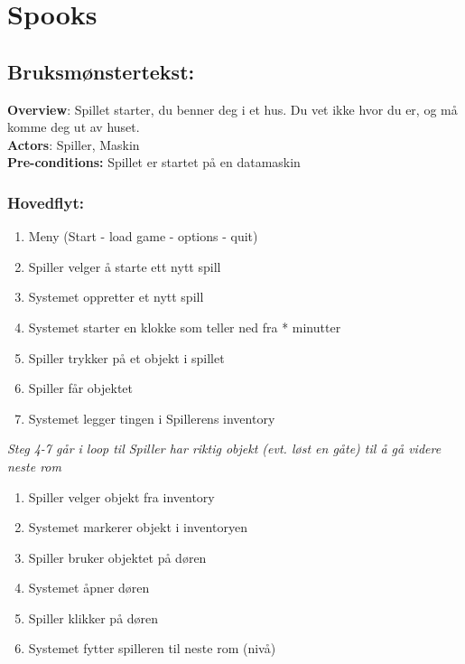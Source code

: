 \documentclass[12pt]{report}
\begin{document}
\section*{Spooks}

\subsection*{Bruksm{\o}nstertekst:}

\textbf{Overview}: Spillet starter, du benner deg i et hus. Du vet ikke hvor du er,
og m{\aa} komme deg ut av huset. 
\bigskip \\
\textbf{Actors}: Spiller, Maskin 
\bigskip \\
\textbf{Pre-conditions:} Spillet er startet p{\aa} en datamaskin

\subsubsection*{Hovedflyt:}

\begin{enumerate}
\item Meny (Start - load game - options - quit)
\item Spiller velger {\aa} starte ett nytt spill
\item Systemet oppretter et nytt spill
\item Systemet starter en klokke som teller ned fra * minutter
\item Spiller trykker p{\aa} et objekt i spillet
\item Spiller f{\aa}r objektet
\item Systemet legger tingen i Spillerens inventory
\end{enumerate}

\textit{Steg 4-7 g{\aa}r i loop til Spiller har riktig objekt (evt. l{\o}st en g{\aa}te) til {\aa} g{\aa} videre neste
rom}

\begin{enumerate}[resume]
\item Spiller velger objekt fra inventory
\item Systemet markerer objekt i inventoryen
\item Spiller bruker objektet p{\aa} d{\o}ren
\item Systemet {\aa}pner d{\o}ren
\item Spiller klikker p{\aa} d{\o}ren
\item Systemet fytter spilleren til neste rom (niv{\aa})
\end{enumerate}
\end{document}
